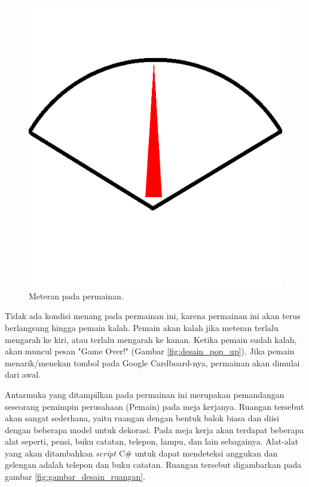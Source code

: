 \begin{figure}[htbp]
\centering
\includegraphics[scale=0.3]{Gambar/HUDBar.png}
\caption{Meteran pada permainan.}
\label{fig:meteran_permainan}
\end{figure}

Tidak ada kondisi menang pada permainan ini, karena permainan ini akan terus berlangsung hingga pemain kalah. Pemain akan kalah jika meteran terlalu mengarah ke kiri, atau terlalu mengarah ke kanan. Ketika pemain sudah kalah, akan muncul pesan "Game Over!" (Gambar \ref{fig:desain_pop_up}). Jika pemain menarik/menekan tombol pada Google Cardboard-nya, permainan akan dimulai dari awal. 

Antarmuka yang ditampilkan pada permainan ini merupakan pemandangan seseorang pemimpin perusahaan (Pemain) pada meja kerjanya. Ruangan tersebut akan sangat sederhana, yaitu ruangan dengan bentuk balok biasa dan diisi dengan beberapa model untuk dekorasi. Pada meja kerja akan terdapat beberapa alat seperti, pensi, buku catatan, telepon, lampu, dan lain sebagainya. Alat-alat yang akan ditambahkan \textit{script} C\# untuk dapat mendeteksi anggukan dan gelengan adalah telepon dan buku catatan. Ruangan tersebut digambarkan pada gambar \ref{fig:gambar_desain_ruangan}.

